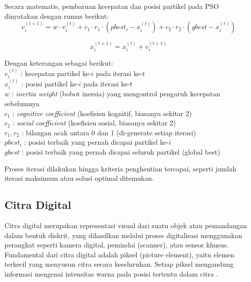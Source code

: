 Secara matematis, pembaruan kecepatan dan posisi partikel pada PSO dinyatakan dengan rumus berikut:
\begin{equation}
	v_{i}^{(t+1)} = w \cdot v_{i}^{(t)} + c_1 \cdot r_1 \cdot (pbest_{i} - x_{i}^{(t)}) + c_2 \cdot r_2 \cdot (gbest - x_{i}^{(t)})
	\label{eq:pso-velocity}
\end{equation}
\vspace{-1.em} %

\begin{equation}
	x_{i}^{(t+1)} = x_{i}^{(t)} + v_{i}^{(t+1)}
	\label{eq:pso-position}
\end{equation}

\noindent
Dengan keterangan sebagai berikut:\\[0.5em]
\hspace*{1.5em}$v_{i}^{(t)}$ : kecepatan partikel ke-$i$ pada iterasi ke-$t$\\
\hspace*{1.5em}$x_{i}^{(t)}$ : posisi partikel ke-$i$ pada iterasi ke-$t$\\
\hspace*{1.5em}$w$ : \textit{inertia weight} (bobot inersia) yang mengontrol pengaruh kecepatan sebelumnya\\
\hspace*{1.5em}$c_1$ : \textit{cognitive coefficient} (koefisien kognitif, biasanya sekitar 2)\\
\hspace*{1.5em}$c_2$ : \textit{social coefficient} (koefisien sosial, biasanya sekitar 2)\\
\hspace*{1.5em}$r_1, r_2$ : bilangan acak antara 0 dan 1 (di-generate setiap iterasi)\\
\hspace*{1.5em}$pbest_{i}$ : posisi terbaik yang pernah dicapai partikel ke-$i$\\
\hspace*{1.5em}$gbest$ : posisi terbaik yang pernah dicapai seluruh partikel (global best)

Proses iterasi dilakukan hingga kriteria penghentian tercapai, seperti jumlah iterasi maksimum atau solusi optimal ditemukan.


\subsection{Citra Digital} \label{II.Citra Digital}
Citra digital merupakan representasi visual dari suatu objek atau pemandangan dalam bentuk diskrit, yang dihasilkan melalui proses digitalisasi menggunakan perangkat seperti kamera digital, pemindai (scanner), atau sensor khusus. Fundamental dari citra digital adalah piksel (picture element), yaitu elemen terkecil yang menyusun citra secara keseluruhan. Setiap piksel mengandung informasi mengenai intensitas warna pada posisi tertentu dalam citra \cite{dijaya2023buku}. 

